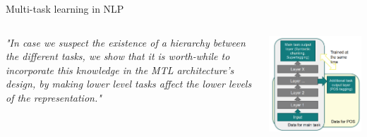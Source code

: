 \documentclass[12pt,aspectratio=169,handout]{beamer}
\begin{document}
\begin{frame}{Multi-task learning in NLP}




\begin{columns}
\hspace*{-8em}\begin{column}{0.48\textwidth}
\begin{small}
\emph{"In case we suspect the existence of a hierarchy between the different tasks, we show that it is worth-while to incorporate this knowledge in the MTL architecture’s design, by making lower level tasks affect the lower levels of the representation." }
\end{small}			
\end{column}
\hspace*{-9.5em} \begin{column}{0.48\textwidth}
	\includegraphics[width=\linewidth]{img/multitask-nlp.png}
\begin{figure}


\end{figure}
\end{column}
\end{columns}
\end{frame}
\end{document}
